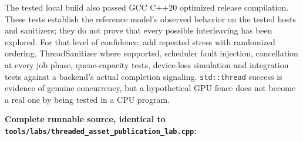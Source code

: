 The tested local build also passed GCC C++20 optimized release compilation. These tests establish the reference model's observed behavior on the tested hosts and sanitizers; they do not prove that every possible interleaving has been explored. For that level of confidence, add repeated stress with randomized ordering, ThreadSanitizer where supported, scheduler fault injection, cancellation at every job phase, queue-capacity tests, device-loss simulation and integration tests against a backend's actual completion signaling. \texttt{std::thread} success is evidence of genuine concurrency, but a hypothetical GPU fence does not become a real one by being tested in a CPU program.

\textbf{Complete runnable source, identical to \texttt{tools/labs/threaded\_asset\_publication\_lab.cpp}:}

